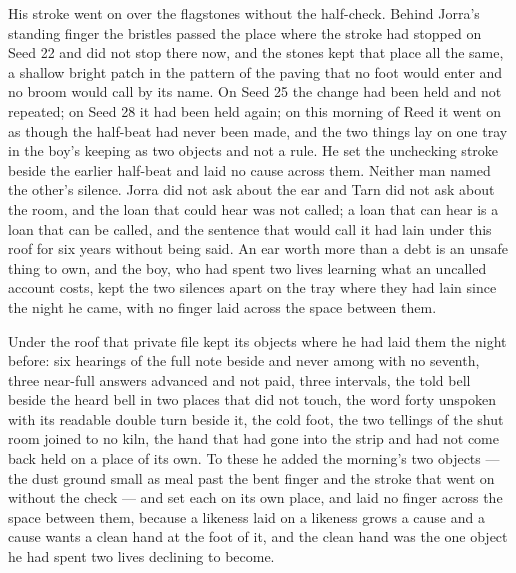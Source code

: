 His stroke went on over the flagstones without the half-check. Behind Jorra's standing finger the bristles passed the place where the stroke had stopped on Seed 22 and did not stop there now, and the stones kept that place all the same, a shallow bright patch in the pattern of the paving that no foot would enter and no broom would call by its name. On Seed 25 the change had been held and not repeated; on Seed 28 it had been held again; on this morning of Reed it went on as though the half-beat had never been made, and the two things lay on one tray in the boy's keeping as two objects and not a rule. He set the unchecking stroke beside the earlier half-beat and laid no cause across them. Neither man named the other's silence. Jorra did not ask about the ear and Tarn did not ask about the room, and the loan that could hear was not called; a loan that can hear is a loan that can be called, and the sentence that would call it had lain under this roof for six years without being said. An ear worth more than a debt is an unsafe thing to own, and the boy, who had spent two lives learning what an uncalled account costs, kept the two silences apart on the tray where they had lain since the night he came, with no finger laid across the space between them.

Under the roof that private file kept its objects where he had laid them the night before: six hearings of the full note beside and never among with no seventh, three near-full answers advanced and not paid, three intervals, the told bell beside the heard bell in two places that did not touch, the word forty unspoken with its readable double turn beside it, the cold foot, the two tellings of the shut room joined to no kiln, the hand that had gone into the strip and had not come back held on a place of its own. To these he added the morning's two objects --- the dust ground small as meal past the bent finger and the stroke that went on without the check --- and set each on its own place, and laid no finger across the space between them, because a likeness laid on a likeness grows a cause and a cause wants a clean hand at the foot of it, and the clean hand was the one object he had spent two lives declining to become.

